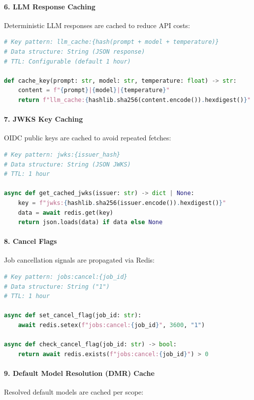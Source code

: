 \paragraph{6. LLM Response Caching}
Deterministic LLM responses are cached to reduce API costs:

\begin{lstlisting}[language=Python, caption={LLM response caching.}]
# Key pattern: llm_cache:{hash(prompt + model + temperature)}
# Data structure: String (JSON response)
# TTL: Configurable (default 1 hour)

def cache_key(prompt: str, model: str, temperature: float) -> str:
    content = f"{prompt}|{model}|{temperature}"
    return f"llm_cache:{hashlib.sha256(content.encode()).hexdigest()}"
\end{lstlisting}

\paragraph{7. JWKS Key Caching}
OIDC public keys are cached to avoid repeated fetches:

\begin{lstlisting}[language=Python, caption={JWKS caching.}]
# Key pattern: jwks:{issuer_hash}
# Data structure: String (JSON JWKS)
# TTL: 1 hour

async def get_cached_jwks(issuer: str) -> dict | None:
    key = f"jwks:{hashlib.sha256(issuer.encode()).hexdigest()}"
    data = await redis.get(key)
    return json.loads(data) if data else None
\end{lstlisting}

\paragraph{8. Cancel Flags}
Job cancellation signals are propagated via Redis:

\begin{lstlisting}[language=Python, caption={Job cancellation flags.}]
# Key pattern: jobs:cancel:{job_id}
# Data structure: String ("1")
# TTL: 1 hour

async def set_cancel_flag(job_id: str):
    await redis.setex(f"jobs:cancel:{job_id}", 3600, "1")

async def check_cancel_flag(job_id: str) -> bool:
    return await redis.exists(f"jobs:cancel:{job_id}") > 0
\end{lstlisting}

\paragraph{9. Default Model Resolution (DMR) Cache}
Resolved default models are cached per scope:

